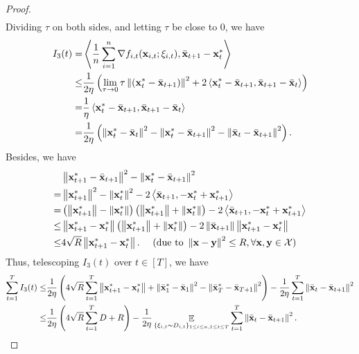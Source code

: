 \documentclass{article}
\begin{document}
\begin{proof}
\begin{align}
\end{align} Dividing $\tau$ on both sides, and letting $\tau$ be close to $0$, we have
\begin{align}
\nonumber
I_3(t) = & \left\langle\frac{1}{n}\sum_{i=1}^n \nabla f_{i,t}({\bf x}_{i,t};\xi_{i,t}), \bar{{\bf x}}_{t+1} - {\bf x}_t^\ast \right\rangle \\ \nonumber 
\le & \frac{1}{2\eta}\left(  \lim_{\tau \rightarrow 0}\tau \left\lVert\left( {\bf x}_t^\ast - \bar{{\bf x}}_{t+1} \right)\right\rVert^2 + 2\left\langle {\bf x}_t^\ast - \bar{{\bf x}}_{t+1}, \bar{{\bf x}}_{t+1} - \bar{{\bf x}}_t  \right\rangle  \right) \\ \nonumber
= & \frac{1}{\eta}\left\langle {\bf x}_t^\ast - \bar{{\bf x}}_{t+1}, \bar{{\bf x}}_{t+1} - \bar{{\bf x}}_t  \right\rangle \\ \label{equa_I3_temp}
= & \frac{1}{2\eta}\left(  \left\lVert{\bf x}_t^\ast - \bar{{\bf x}}_t\right\rVert^2 - \left\lVert{\bf x}_t^\ast - \bar{{\bf x}}_{t+1}\right\rVert^2 - \left\lVert\bar{{\bf x}}_t - \bar{{\bf x}}_{t+1}\right\rVert^2  \right). 
\end{align} Besides, we have
\begin{align}
\nonumber
& \left\lVert{\bf x}_{t+1}^\ast - \bar{{\bf x}}_{t+1}\right\rVert^2 - \left\lVert{\bf x}_t^\ast - \bar{{\bf x}}_{t+1}\right\rVert^2 \\ \nonumber 
= & \left\lVert{\bf x}_{t+1}^\ast\right\rVert^2 - \left\lVert{\bf x}_t^\ast\right\rVert^2 - 2\left\langle\bar{{\bf x}}_{t+1}, -{\bf x}_t^\ast + {\bf x}_{t+1}^\ast \right\rangle \\ \nonumber
= & \left( \left\lVert{\bf x}_{t+1}^\ast\right\rVert - \left\lVert{\bf x}_t^\ast\right\rVert \right) \left( \left\lVert{\bf x}_{t+1}^\ast\right\rVert + \left\lVert{\bf x}_t^\ast\right\rVert \right) - 2\left\langle\bar{{\bf x}}_{t+1}, -{\bf x}_t^\ast + {\bf x}_{t+1}^\ast \right\rangle \\ \nonumber
\le & \left\lVert{\bf x}_{t+1}^\ast - {\bf x}_t^\ast\right\rVert \left( \left\lVert{\bf x}_{t+1}^\ast\right\rVert + \left\lVert{\bf x}_t^\ast\right\rVert \right) - 2\left\lVert\bar{{\bf x}}_{t+1}\right\rVert \left\lVert{\bf x}_{t+1}^\ast-{\bf x}_t^\ast\right\rVert \\ \nonumber
\le & 4\sqrt{R}\left\lVert{\bf x}_{t+1}^\ast - {\bf x}_t^\ast\right\rVert.    ~~~~(\text{due to } \left\lVert{\bf x} - {\bf y}\right\rVert^2 \le R, \forall {\bf x}, {\bf y}\in{\mathcal{X}}) 
\end{align} Thus, telescoping $I_3(t)$ over $t\in[T]$, we have 
\begin{align}
\nonumber
\sum_{t=1}^T I_3(t) \le & \frac{1}{2\eta}\left(  4\sqrt{R}\sum_{t=1}^T\left\lVert{\bf x}_{t+1}^\ast - {\bf x}_t^\ast\right\rVert + \left\lVert\bar{{\bf x}}_1^\ast - \bar{{\bf x}}_1\right\rVert^2 - \left\lVert\bar{{\bf x}}_T^\ast - \bar{{\bf x}}_{T+1}\right\rVert^2  \right) - \frac{1}{2\eta} \sum_{t=1}^T \left\lVert\bar{{\bf x}}_t - \bar{{\bf x}}_{t+1}\right\rVert^2 \\ \nonumber
\le & \frac{1}{2\eta}\left(  4\sqrt{R}\sum_{t=1}^T D + R  \right) - \frac{1}{2\eta} \mathop{\mathbb{E}}_{ \{\xi_{i,t} \sim D_{i,t}\}_{1\le i \le n, 1\le t\le T} }\sum_{t=1}^T \left\lVert\bar{{\bf x}}_t - \bar{{\bf x}}_{t+1} \right\rVert^2.
\end{align} 



\end{proof}
\end{document}
